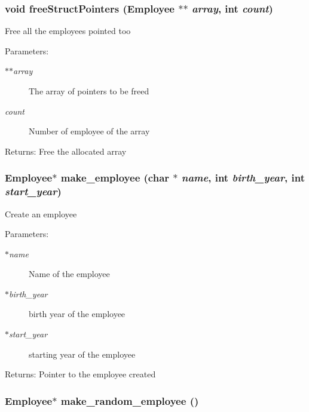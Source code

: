 \subsubsection{\setlength{\rightskip}{0pt plus 5cm}void free\-Struct\-Pointers (\bf{Employee} $\ast$$\ast$ {\em array}, int {\em count})}\label{employee_8h_8cbffab9992d4581bf1ebe9a9f9b7808}


Free all the employees pointed too \begin{Desc}
\item[Parameters:]
\begin{description}
\item[{\em $\ast$$\ast$array}]The array of pointers to be freed \item[{\em count}]Number of employee of the array \end{description}
\end{Desc}
\begin{Desc}
\item[Returns:]Free the allocated array \end{Desc}
\subsubsection{\setlength{\rightskip}{0pt plus 5cm}\bf{Employee}$\ast$ make\_\-employee (char $\ast$ {\em name}, int {\em birth\_\-year}, int {\em start\_\-year})}\label{employee_8h_4ec02c0371db62478fa60506c4fee708}


Create an employee \begin{Desc}
\item[Parameters:]
\begin{description}
\item[{\em $\ast$name}]Name of the employee \item[{\em $\ast$birth\_\-year}]birth year of the employee \item[{\em $\ast$start\_\-year}]starting year of the employee \end{description}
\end{Desc}
\begin{Desc}
\item[Returns:]Pointer to the employee created \end{Desc}
\subsubsection{\setlength{\rightskip}{0pt plus 5cm}\bf{Employee}$\ast$ make\_\-random\_\-employee ()}\label{employee_8h_a7772eda2627a2113d449b6fa0d6a848}


